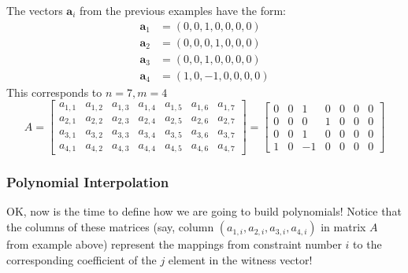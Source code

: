 \documentclass[../lecture-notes.tex]{subfiles}
\begin{document}
\begin{example}
    The vectors $\mathbf{a}_i$ from the previous examples have the form:
    \begin{align*}
        \mathbf{a}_1 &= (0, 0, 1, 0, 0, 0, 0) \\
        \mathbf{a}_2 &= (0, 0, 0, 1, 0, 0, 0) \\
        \mathbf{a}_3 &= (0, 0, 1, 0, 0, 0, 0) \\
        \mathbf{a}_4 &= (1, 0, -1, 0, 0, 0, 0)
    \end{align*}
    This corresponds to $n = 7, m = 4$
    \begin{equation*}
        A = \begin{bmatrix}
            a_{1,1} & a_{1,2} & a_{1,3} & a_{1,4} & a_{1,5} & a_{1,6} & a_{1,7} \\
            a_{2,1} & a_{2,2} & a_{2,3} & a_{2,4} & a_{2,5} & a_{2,6} & a_{2,7} \\
            a_{3,1} & a_{3,2} & a_{3,3} & a_{3,4} & a_{3,5} & a_{3,6} & a_{3,7} \\
            a_{4,1} & a_{4,2} & a_{4,3} & a_{4,4} & a_{4,5} & a_{4,6} & a_{4,7}
        \end{bmatrix} = \begin{bmatrix}
            0 & 0 & 1 & 0 & 0 & 0 & 0 \\
            0 & 0 & 0 & 1 & 0 & 0 & 0 \\
            0 & 0 & 1 & 0 & 0 & 0 & 0 \\
            1 & 0 & -1 & 0 & 0 & 0 & 0 
        \end{bmatrix}
    \end{equation*}
\end{example}

\subsubsection{Polynomial Interpolation}

OK, now is the time to define how we are going to build polynomials! Notice that the columns of these matrices (say, column $(a_{1,i},a_{2,i},a_{3,i},a_{4,i})$ in matrix $A$ from example above) represent the mappings from constraint number $i$ to the corresponding
coefficient of the $j$ element in the witness vector!
\end{document}
